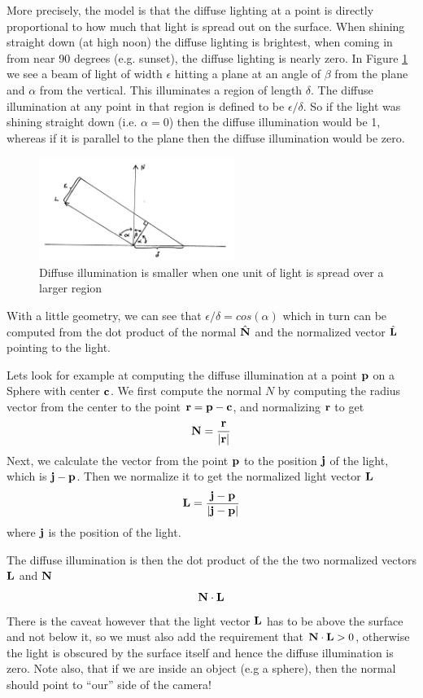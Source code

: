 \documentclass{book}
\newcommand{\vect}[1]{{\bf{ #1}}}
\begin{document}
More precisely, the model is that the diffuse lighting at a point
is directly proportional to how much that light is spread out on the surface. When shining straight down (at high noon) the diffuse lighting is brightest, when coming in from near 90 degrees (e.g. sunset), the diffuse lighting is nearly zero.
In Figure \ref{fig:diffuse} we see a beam of light of width $\epsilon$ hitting a plane at an angle of $\beta$ from the plane and $\alpha$ from the vertical. This illuminates a region of length $\delta$.  The diffuse illumination at any point in that region is defined to be $\epsilon/\delta$.  So if the light was shining straight down (i.e. $\alpha=0$) then the diffuse illumination would be 1, whereas if it is parallel to the plane then the diffuse illumination would be zero.

\begin{figure}[h]
\centering
\includegraphics[width=2.5in]{images/diffuse2.jpg}
\caption{Diffuse illumination is smaller when one unit of light is spread over a larger region\label{fig:diffuse}}
\end{figure}

With a little geometry, we can see that $\epsilon/\delta = cos(\alpha)$ which in turn can be computed from the dot product of the normal $\hat\vect N$  and the normalized vector $\hat \vect L$ pointing to the light.

Lets look for example at computing the diffuse illumination at a point ${\vect p}$ on a Sphere with center ${\vect c}$. We first compute the normal $N$ by computing the radius vector from the center to the point ${\vect r} = {\vect p} - {\vect c}$, and normalizing ${\vect r}$ to get
\[
{\vect N} = \frac{{\vect r}}{{\vert {\vect r}\vert}}
\]
Next, we calculate the vector from the point ${\vect p}$ to the position ${\vect j}$ of the light,
which is ${\vect j} - {\vect p}$. Then we normalize it  to get the normalized light vector ${\vect L}$
\[
{ \vect L} = \frac{{\vect j} - {\vect p}}{{\vert {\vect j} - {\vect p} \vert}}
\]
where ${\vect j}$ is the position of the light.

The diffuse illumination is then the dot product of the the two normalized vectors $\vect L$ and $\vect N$
\[
{\vect  N} \cdot {\vect L}
\]
There is the caveat however that the light vector $\vect L$ has to be above the surface and not below it, so we must also add the requirement that ${\vect  N} \cdot {\vect L} > 0$, otherwise the light is obscured by the surface itself and hence the diffuse illumination is zero.   Note also, that if we are inside an object (e.g a sphere), then the normal should point to ``our'' side of the camera!
\end{document}
